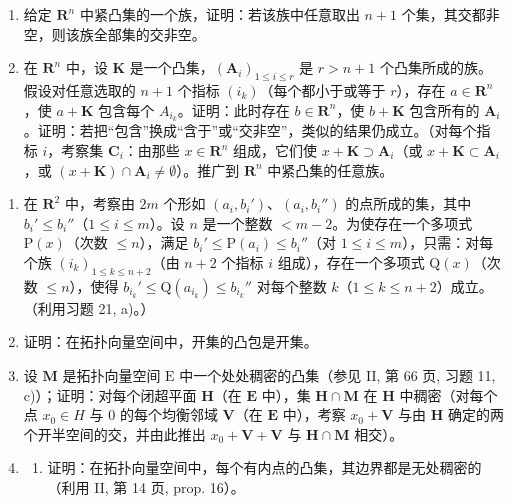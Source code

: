 \begin{enumerate}
\def\labelenumi{\alph{enumi})}
\setcounter{enumi}{1}
\item
  给定 \(\mathbf{R}^n\) 中紧凸集的一个族，证明：若该族中任意取出 \(n + 1\) 个集，其交都非空，则该族全部集的交非空。
\item
  在 \(\mathbf{R}^n\) 中，设 \(\mathbf{K}\) 是一个凸集，\((\mathbf{A}_i)_{1 \leqslant i \leqslant r}\) 是 \(r > n + 1\) 个凸集所成的族。假设对任意选取的 \(n + 1\) 个指标 \((i_k)\)（每个都小于或等于 \(r\)），存在 \(a \in \mathbf{R}^n\)，使 \(a + \mathbf{K}\) 包含每个 \(A_{i_k}\)。证明：此时存在 \(b \in \mathbf{R}^n\)，使 \(b + \mathbf{K}\) 包含所有的 \(\mathbf{A}_i\)。证明：若把“包含”换成“含于”或“交非空”，类似的结果仍成立。（对每个指标 \(i\)，考察集 \(\mathbf{C}_i\)：由那些 \(x \in \mathbf{R}^n\) 组成，它们使 \(x + \mathbf{K} \supset \mathbf{A}_i\)（或 \(x + \mathbf{K} \subset \mathbf{A}_i\)，或 \((x + \mathbf{K}) \cap \mathbf{A}_i \neq \emptyset\)）。推广到 \(\mathbf{R}^n\) 中紧凸集的任意族。
\end{enumerate}

\begin{enumerate}
\def\labelenumi{\arabic{enumi})}
\setcounter{enumi}{21}
\item
  在 \(\mathbf{R}^2\) 中，考察由 \(2m\) 个形如 \((a_i, b_i')\)、\((a_i, b_i'')\) 的点所成的集，其中 \(b_i' \leqslant b_i''\)（\(1 \leqslant i \leqslant m\)）。设 \(n\) 是一个整数 \(< m - 2\)。为使存在一个多项式 \(\mathrm{P}(x)\)（次数 \(\leqslant n\)），满足 \(b_i' \leqslant \mathrm{P}(a_i) \leqslant b_i''\)（对 \(1 \leqslant i \leqslant m\)），只需：对每个族 \((i_k)_{1 \leqslant k \leqslant n + 2}\)（由 \(n + 2\) 个指标 \(i\) 组成），存在一个多项式 \(\mathrm{Q}(x)\)（次数 \(\leqslant n\)），使得 \(b_{i_k}' \leqslant \mathrm{Q}(a_{i_k}) \leqslant b_{i_k}''\) 对每个整数 \(k\)（\(1 \leqslant k \leqslant n + 2\)）成立。（利用习题 21, a)。）
\item
  证明：在拓扑向量空间中，开集的凸包是开集。
\item
  设 \(\mathbf{M}\) 是拓扑向量空间 \(\mathrm{E}\) 中一个处处稠密的凸集（参见 II, 第 66 页, 习题 11, c)）；证明：对每个闭超平面 \(\mathbf{H}\)（在 \(\mathbf{E}\) 中），集 \(\mathbf{H} \cap \mathbf{M}\) 在 \(\mathbf{H}\) 中稠密（对每个点 \(x_0 \in H\) 与 0 的每个均衡邻域 \(\mathbf{V}\)（在 \(\mathbf{E}\) 中），考察 \(x_0 + \mathbf{V}\) 与由 \(\mathbf{H}\) 确定的两个开半空间的交，并由此推出 \(x_0 + \mathbf{V} + \mathbf{V}\) 与 \(\mathbf{H} \cap \mathbf{M}\) 相交）。
\item
  \begin{enumerate}
  \def\labelenumii{\alph{enumii})}
  \tightlist
  \item
    证明：在拓扑向量空间中，每个有内点的凸集，其边界都是无处稠密的（利用 II, 第 14 页, prop. 16）。
  \end{enumerate}
\end{enumerate}

